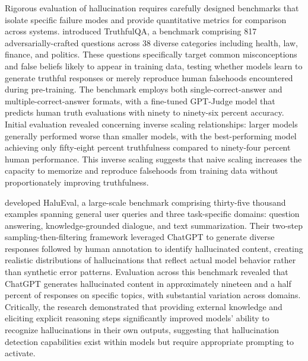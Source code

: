 Rigorous evaluation of hallucination requires carefully designed benchmarks that isolate specific failure modes and provide quantitative metrics for comparison across systems. \citet{lin2022truthfulqa} introduced TruthfulQA, a benchmark comprising 817 adversarially-crafted questions across 38 diverse categories including health, law, finance, and politics. These questions specifically target common misconceptions and false beliefs likely to appear in training data, testing whether models learn to generate truthful responses or merely reproduce human falsehoods encountered during pre-training. The benchmark employs both single-correct-answer and multiple-correct-answer formats, with a fine-tuned GPT-Judge model that predicts human truth evaluations with ninety to ninety-six percent accuracy. Initial evaluation revealed concerning inverse scaling relationships: larger models generally performed worse than smaller models, with the best-performing model achieving only fifty-eight percent truthfulness compared to ninety-four percent human performance. This inverse scaling suggests that naive scaling increases the capacity to memorize and reproduce falsehoods from training data without proportionately improving truthfulness.

\citet{li2023halueval} developed HaluEval, a large-scale benchmark comprising thirty-five thousand examples spanning general user queries and three task-specific domains: question answering, knowledge-grounded dialogue, and text summarization. Their two-step sampling-then-filtering framework leveraged ChatGPT to generate diverse responses followed by human annotation to identify hallucinated content, creating realistic distributions of hallucinations that reflect actual model behavior rather than synthetic error patterns. Evaluation across this benchmark revealed that ChatGPT generates hallucinated content in approximately nineteen and a half percent of responses on specific topics, with substantial variation across domains. Critically, the research demonstrated that providing external knowledge and eliciting explicit reasoning steps significantly improved models' ability to recognize hallucinations in their own outputs, suggesting that hallucination detection capabilities exist within models but require appropriate prompting to activate.

